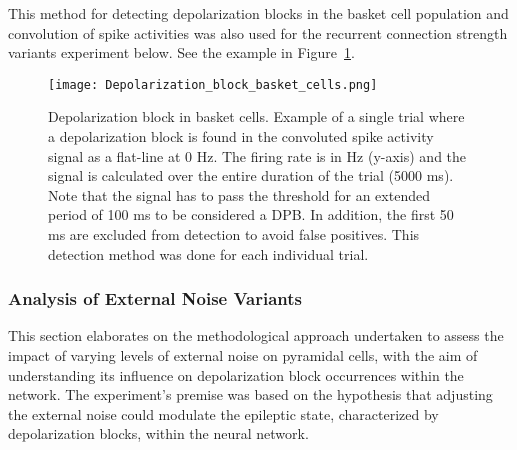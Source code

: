 \noindent
This method for detecting depolarization blocks in the basket cell population
and convolution of spike activities was also used for the recurrent
connection strength variants experiment below. See the example in Figure~\ref{fig:depolarization_block_basket_cells}.

\begin{figure}[htbp]
    \centering
    \texttt{[image: Depolarization\_block\_basket\_cells.png]}
    \caption[Depolarization block in basket cells]{Depolarization block in basket cells. Example of a single trial where a depolarization block is found in the convoluted spike activity signal as a flat-line at 0 Hz. The firing rate is in Hz (y-axis) and the signal is calculated over the entire duration of the trial (5000 ms).
        Note that the signal has to pass the threshold for an extended period of 100 ms to be considered a DPB\@.
        In addition, the first 50 ms are excluded from detection to avoid false positives. This detection method was done for each individual trial.}\label{fig:depolarization_block_basket_cells}
\end{figure}
\pagebreak

\subsubsection{Analysis of External Noise Variants}
This section elaborates on the methodological approach undertaken to assess the
impact of varying levels of external noise on pyramidal cells, with the aim of
understanding its influence on depolarization block occurrences within the
network. The experiment's premise was based on the hypothesis that adjusting
the external noise could modulate the epileptic state, characterized by
depolarization blocks, within the neural network.\\

